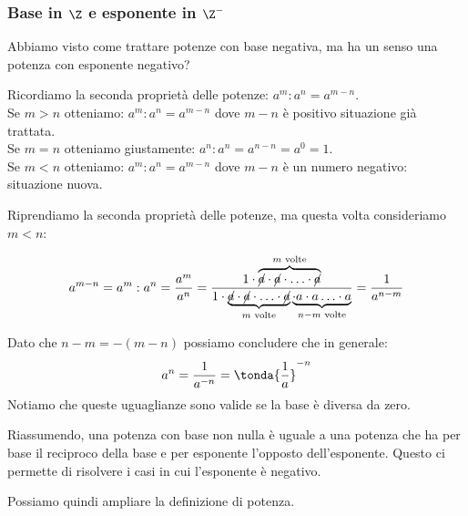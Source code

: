 % 

\subsubsection{Base in 
\texorpdfstring{$\Z$ e esponente in $\Z^-$}{Z e esponente in Z-}}

Abbiamo visto come trattare potenze con base negativa, ma ha un senso una 
potenza con esponente negativo?

Ricordiamo la seconda proprietà delle potenze: \(a^m : a^n = a^{m-n}\). \\
Se \(m > n\) otteniamo: \(a^m : a^n = a^{m-n}\) dove \(m-n\) è 
positivo situazione già trattata.\\
Se \(m = n\) otteniamo giustamente: \(a^n : a^n = a^{n-n} = a^0 = 1\).\\
Se \(m < n\) otteniamo: \(a^m : a^n = a^{m-n}\) dove \(m-n\) è 
un numero negativo: situazione nuova.

Riprendiamo la seconda proprietà delle potenze, ma questa volta 
consideriamo \(m < n\):

\[
 a^{m-n} = a^m: a^n = \frac{a^m}{a^n}=
 \frac{1 \cdot \overbrace{\cancel{a} \cdot \cancel{a} \cdot 
       \ldots \cdot \cancel{a}}^{m \text{ volte}}}
      {1 \cdot \underbrace{\cancel{a} \cdot \cancel{a} \cdot
                           \ldots \cdot \cancel{a}}_{m \text{ volte}} 
               \underbrace{\cdot a \cdot a \ldots 
                           \cdot a}_{n-m \text{ volte}}}=
 \frac{1}{a^{n-m}}
\]

Dato che \(n-m = -(m-n)\) possiamo concludere che in generale:
\[a^n = \frac{1}{a^{-n}} = \tonda{\frac{1}{a}}^{-n}\]
Notiamo che queste uguaglianze sono valide se la base è diversa da zero.

Riassumendo, una potenza con base non nulla è uguale a una potenza che ha 
per base il reciproco della base e per esponente l'opposto dell'esponente.
Questo ci permette di risolvere i casi in cui l'esponente è negativo.

Possiamo quindi ampliare la definizione di potenza.


